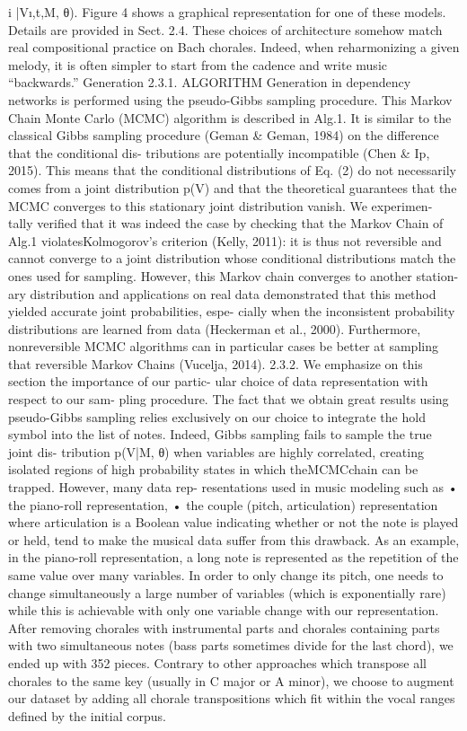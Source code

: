 i |V\i,t,M, θ). Figure 4 shows a graphical representation for one of these models. Details are provided in Sect. 2.4. These choices of architecture somehow match real compositional practice on Bach chorales. Indeed, when reharmonizing a given melody, it is often simpler to start from the cadence and write music “backwards.” Generation 2.3.1. ALGORITHM Generation in dependency networks is performed using the pseudo-Gibbs sampling procedure. This Markov Chain Monte Carlo (MCMC) algorithm is described in Alg.1. It is similar to the classical Gibbs sampling procedure (Geman & Geman, 1984) on the difference that the conditional dis- tributions are potentially incompatible (Chen & Ip, 2015). This means that the conditional distributions of Eq. (2) do not necessarily comes from a joint distribution p(V) and that the theoretical guarantees that the MCMC converges to this stationary joint distribution vanish. We experimen- tally verified that it was indeed the case by checking that the Markov Chain of Alg.1 violatesKolmogorov’s criterion (Kelly, 2011): it is thus not reversible and cannot converge to a joint distribution whose conditional distributions match the ones used for sampling. However, this Markov chain converges to another station- ary distribution and applications on real data demonstrated that this method yielded accurate joint probabilities, espe- cially when the inconsistent probability distributions are learned from data (Heckerman et al., 2000). Furthermore, nonreversible MCMC algorithms can in particular cases be better at sampling that reversible Markov Chains (Vucelja, 2014). 2.3.2. We emphasize on this section the importance of our partic- ular choice of data representation with respect to our sam- pling procedure. The fact that we obtain great results using pseudo-Gibbs sampling relies exclusively on our choice to integrate the hold symbol into the list of notes. Indeed, Gibbs sampling fails to sample the true joint dis-
tribution p(V|M, θ) when variables are highly correlated, creating isolated regions of high probability states in which theMCMCchain can be trapped. However, many data rep- resentations used in music modeling such as
• the piano-roll representation,
• the couple (pitch, articulation) representation where articulation is a Boolean value indicating whether or not the note is played or held,
tend to make the musical data suffer from this drawback.
As an example, in the piano-roll representation, a long note is represented as the repetition of the same value over many variables. In order to only change its pitch, one needs to change simultaneously a large number of variables (which is exponentially rare) while this is achievable with only one variable change with our representation. After removing chorales with instrumental parts and chorales containing parts with two simultaneous notes (bass parts sometimes divide for the last chord), we ended up with 352 pieces. Contrary to other approaches which transpose all chorales to the same key (usually in C major or A minor), we choose to augment our dataset by adding all chorale transpositions which fit within the vocal ranges defined by the initial corpus.
